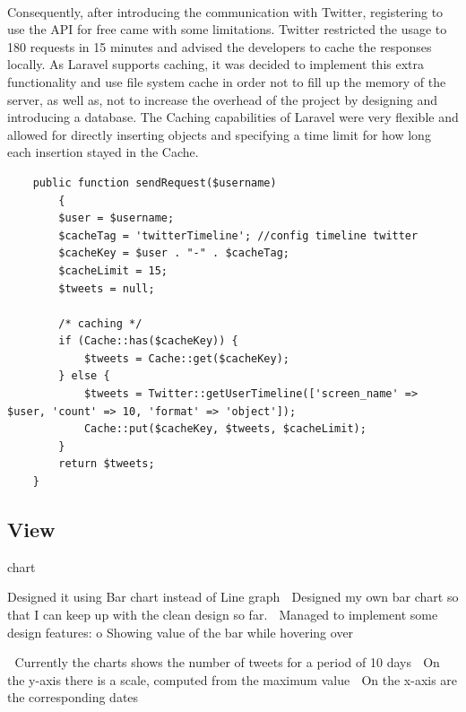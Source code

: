 \documentclass{l4proj}
\begin{document}
\paragraph{}
Consequently, after introducing the communication with Twitter, registering to use the API for free came with some limitations. Twitter restricted the usage to 180 requests in 15 minutes and advised the developers to cache the responses locally. As Laravel supports caching, it was decided to implement this extra functionality and use file system cache in order not to fill up the memory of the server, as well as, not to increase the overhead of the project by designing and introducing a database. The Caching capabilities of Laravel were very flexible and allowed for directly inserting objects and specifying a time limit for how long each insertion stayed in the Cache. 
\begin{lstlisting}
    public function sendRequest($username)
	    {
	    $user = $username;
	    $cacheTag = 'twitterTimeline'; //config timeline twitter
	    $cacheKey = $user . "-" . $cacheTag;
	    $cacheLimit = 15;
	    $tweets = null;
	    
	    /* caching */
	    if (Cache::has($cacheKey)) {
		    $tweets = Cache::get($cacheKey);
	    } else {
		    $tweets = Twitter::getUserTimeline(['screen_name' => $user, 'count' => 10, 'format' => 'object']);
		    Cache::put($cacheKey, $tweets, $cacheLimit);
	    }
	    return $tweets;
    }
\end{lstlisting}


\subsection{View}

chart

Designed it using Bar chart instead of Line graph
 Designed my own bar chart so that I can keep up with the clean design so far.
 Managed to implement some design features:
o Showing value of the bar while hovering over

 Currently the charts shows the number of tweets for a period of 10 days
 On the y-axis there is a scale, computed from the maximum value
 On the x-axis are the corresponding dates
\end{document}
